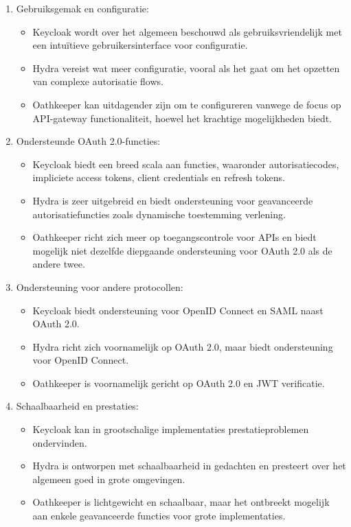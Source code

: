 \begin{enumerate}
  \item Gebruiksgemak en configuratie:
  \begin{itemize}
    \item Keycloak wordt over het algemeen beschouwd als gebruiksvriendelijk met een intuïtieve gebruikersinterface voor configuratie.
    \item Hydra vereist wat meer configuratie, vooral als het gaat om het opzetten van complexe autorisatie flows.
    \item Oathkeeper kan uitdagender zijn om te configureren vanwege de focus op API-gateway functionaliteit, hoewel het krachtige mogelijkheden biedt.
  \end{itemize}
  
  \item Ondersteunde OAuth 2.0-functies:
  \begin{itemize}
    \item Keycloak biedt een breed scala aan functies, waaronder autorisatiecodes, impliciete access tokens, client credentials en refresh tokens.
    \item Hydra is zeer uitgebreid en biedt ondersteuning voor geavanceerde autorisatiefuncties zoals dynamische toestemming verlening.
    \item Oathkeeper richt zich meer op toegangscontrole voor APIs en biedt mogelijk niet dezelfde diepgaande ondersteuning voor OAuth 2.0 als de andere twee.
  \end{itemize}
  
  \item Ondersteuning voor andere protocollen:
  \begin{itemize}
    \item Keycloak biedt ondersteuning voor OpenID Connect en SAML naast OAuth 2.0.
    \item Hydra richt zich voornamelijk op OAuth 2.0, maar biedt ondersteuning voor OpenID Connect.
    \item Oathkeeper is voornamelijk gericht op OAuth 2.0 en JWT verificatie.
  \end{itemize}
  
  \item Schaalbaarheid en prestaties:
  \begin{itemize}
    \item Keycloak kan in grootschalige implementaties prestatieproblemen ondervinden.
    \item Hydra is ontworpen met schaalbaarheid in gedachten en presteert over het algemeen goed in grote omgevingen.
    \item Oathkeeper is lichtgewicht en schaalbaar, maar het ontbreekt mogelijk aan enkele geavanceerde functies voor grote implementaties.
  \end{itemize}
  

\end{enumerate}
